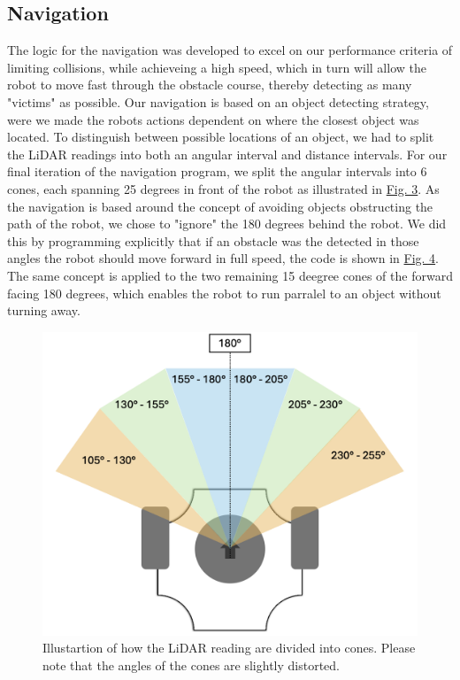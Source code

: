 \documentclass[conference]{IEEEtran}
\begin{document}
\subsection{Navigation}
The logic for the navigation was developed to excel on our performance criteria of limiting collisions, while achieveing a high speed, which in turn will allow the robot to move fast through the obstacle course, thereby detecting as many "victims" as possible.
Our navigation is based on an object detecting strategy, were we made the robots actions dependent on where the closest object was located.
To distinguish between possible locations of an object, we had to split the LiDAR readings into both an angular interval and distance intervals.
For our final iteration of the navigation program, we split the angular intervals into 6 cones, each spanning 25 degrees in front of the robot as illustrated in \href{sec:angles}{Fig. 3}. 
As the navigation is based around the concept of avoiding objects obstructing the path of the robot, we chose to "ignore" the 180 degrees behind the robot. 
We did this by programming explicitly that if an obstacle was the detected in those angles the robot should move forward in full speed, the code is shown in \href{sec:ignore}{Fig. 4}.
The same concept is applied to the two remaining 15 deegree cones of the forward facing 180 degrees, which enables the robot to run parralel to an object without turning away.
\begin{figure}[t]
    \centerline{\includegraphics[width=1.0\columnwidth]{Pictures/LiDAR Angels.png}}
    \caption{Illustartion of how the LiDAR reading are divided into cones.
    Please note that the angles of the cones are slightly distorted.}
    \label{sec:angles}
    \end{figure}
\end{document}
